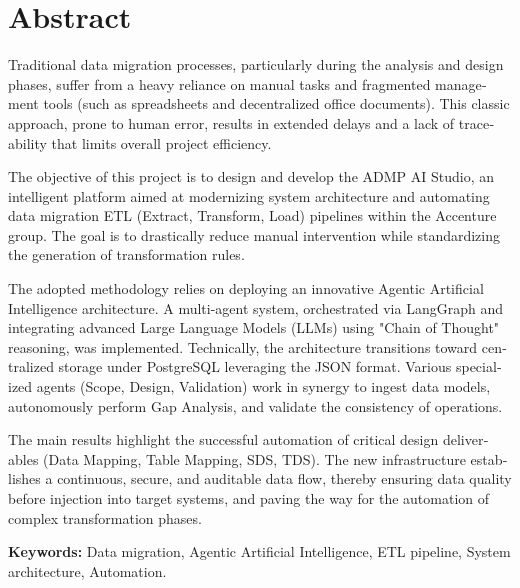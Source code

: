 \section*{Abstract}


\begin{otherlanguage}{english}
Traditional data migration processes, particularly during the analysis and design phases, suffer from a heavy reliance on manual tasks and fragmented management tools (such as spreadsheets and decentralized office documents). This classic approach, prone to human error, results in extended delays and a lack of traceability that limits overall project efficiency.

The objective of this project is to design and develop the ADMP AI Studio, an intelligent platform aimed at modernizing system architecture and automating data migration ETL (Extract, Transform, Load) pipelines within the Accenture group. The goal is to drastically reduce manual intervention while standardizing the generation of transformation rules.

The adopted methodology relies on deploying an innovative Agentic Artificial Intelligence architecture. A multi-agent system, orchestrated via LangGraph and integrating advanced Large Language Models (LLMs) using "Chain of Thought" reasoning, was implemented. Technically, the architecture transitions toward centralized storage under PostgreSQL leveraging the JSON format. Various specialized agents (Scope, Design, Validation) work in synergy to ingest data models, autonomously perform Gap Analysis, and validate the consistency of operations.

The main results highlight the successful automation of critical design deliverables (Data Mapping, Table Mapping, SDS, TDS). The new infrastructure establishes a continuous, secure, and auditable data flow, thereby ensuring data quality before injection into target systems, and paving the way for the automation of complex transformation phases.
\end{otherlanguage}

\vspace{1em}
\noindent\textbf{Keywords:} Data migration, Agentic Artificial Intelligence, ETL pipeline, System architecture, Automation.
